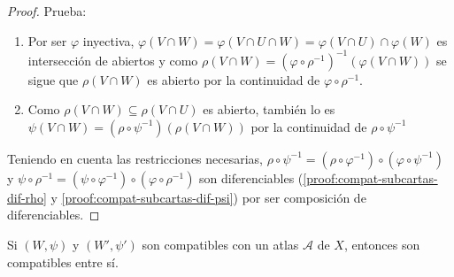 \documentclass[\main/VD_completo.tex]{subfiles}
\begin{document}
\begin{proof}
  Prueba:
  \begin{enumerate}
  \item[\ref{proof:compat-subcartas-ab-rho}.] Por ser \(\varphi\) inyectiva,
    \(\varphi(V \cap W) = \varphi(V \cap U \cap W) = \varphi(V \cap U) \cap
    \varphi(W)\) es intersección de abiertos y como \(\rho(V \cap W) = (\varphi
    \circ \rho^{-1})^{-1}(\varphi(V \cap W))\) se sigue que \(\rho(V \cap W)\)
    es abierto por la continuidad de \(\varphi \circ \rho^{-1}\).
  \item[\ref{proof:compat-subcartas-ab-psi}.] Como \(\rho(V \cap W) \subseteq
    \rho(V \cap U)\) es abierto, también lo es \(\psi(V \cap W) = (\rho \circ
    \psi^{-1})(\rho(V \cap W))\) por la continuidad de \(\rho \circ \psi^{-1}\)
  \end{enumerate}
  Teniendo en cuenta las restricciones necesarias, \(\rho \circ \psi^{-1} =
  (\rho \circ \varphi^{-1}) \circ (\varphi \circ \psi^{-1})\) y \(\psi \circ
  \rho^{-1} = (\psi \circ \varphi^{-1}) \circ (\varphi \circ \rho^{-1})\) son
  diferenciables (\ref{proof:compat-subcartas-dif-rho} y
  \ref{proof:compat-subcartas-dif-psi}) por ser composición de diferenciables.
\end{proof}

\begin{lemma}
  \label{lem:compat-trans-atlas}
  Si \((W, \psi)\) y \((W', \psi')\) son compatibles con un atlas \(\mathcal{A}\) de
  \(X\), entonces son compatibles entre sí.
\end{lemma}
\end{document}
